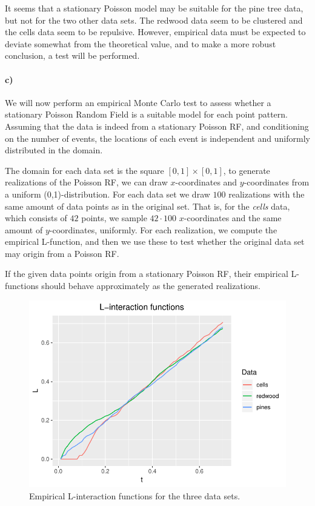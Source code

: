 It seems that a stationary Poisson model may be suitable for the pine tree data, but not for the two other data sets. The redwood data seem to be clustered and the cells data seem to be repulsive. However, empirical data must be expected to deviate somewhat from the theoretical value, and to make a more robust conclusion, a test will be performed.

\paragraph{c)}
We will now perform an empirical Monte Carlo test to assess whether a stationary Poisson Random Field is a suitable model for each point pattern. Assuming that the data is indeed from a stationary Poisson RF, and conditioning on the number of events, the locations of each event is independent and uniformly distributed in the domain. 

The domain for each data set is the square $[0,1] \times [0,1]$, to generate realizations of the Poisson RF, we can draw $x$-coordinates and $y$-coordinates from a uniform (0,1)-distribution. For each data set we draw $100$ realizations with the same amount of data points as in the original set. That is, for the \textit{cells} data, which consists of $42$ points, we sample $42\cdot 100$ $x$-coordinates and the same amount of $y$-coordinates, uniformly. For each realization, we compute the empirical L-function, and then we use these to test whether the original data set may origin from a Poisson RF.

If the given data points origin from a stationary Poisson RF, their empirical L-functions should behave approximately as the generated realizations. 

\begin{figure}
    \centering
    \includegraphics[scale=0.95]{figures/prob1_L_empirical.pdf}
    \caption{Empirical L-interaction functions for the three data sets.}
    \label{fig:L_emp}
\end{figure}

